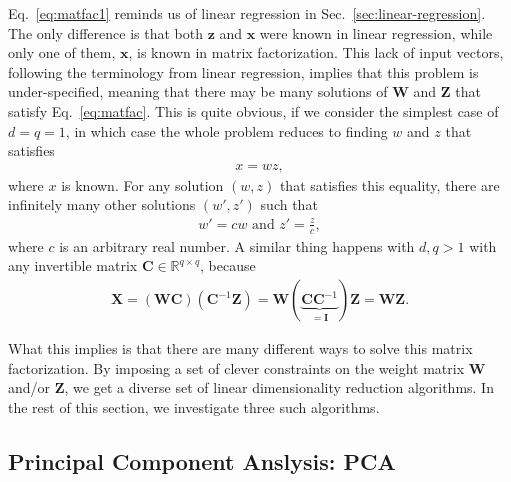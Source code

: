 \documentclass{report}
\newcommand{\vect}[1]{\mathbf{#1}}
\newcommand{\matr}[1]{\mathbf{#1}}
\newcommand{\vx}[0]{\vect{x}}
\newcommand{\vz}[0]{\vect{z}}
\newcommand{\mW}[0]{\matr{W}}
\newcommand{\mZ}[0]{\matr{Z}}
\newcommand{\mX}[0]{\matr{X}}
\newcommand{\mC}{\matr{C}}
\newcommand{\mI}{\matr{I}}
\newcommand{\RR}[0]{\mathbb{R}}
\begin{document}
Eq.~\eqref{eq:matfac1} reminds us of linear regression in
Sec.~\ref{sec:linear-regression}. The only difference is that both $\vz$ and
$\vx$ were known in linear regression, while only one of them, $\vx$, is known
in matrix factorization. This lack of input vectors, following the terminology
from linear regression, implies that this problem is under-specified, meaning
that there may be many solutions of $\mW$ and $\mZ$ that satisfy
Eq.~\eqref{eq:matfac}. This is quite obvious, if we consider the simplest case
of $d=q=1$, in which case the whole problem reduces to finding $w$ and $z$ that
satisfies
\begin{align*}
    x = w z,
\end{align*}
where $x$ is known. For any solution $(w, z)$ that satisfies this equality,
there are infinitely many other solutions $(w', z')$ such that
\begin{align*}
    w' = cw\text{ and }
    z' = \frac{z}{c},
\end{align*}
where $c$ is an arbitrary real number. A similar thing happens with $d, q > 1$
with any invertible matrix $\mC \in \RR^{q \times q}$, because
\begin{align*}
    \mX = (\mW \mC)(\mC^{-1} \mZ) = \mW (\underbrace{\mC \mC^{-1}}_{=\mI}) \mZ = \mW \mZ.
\end{align*}

What this implies is that there are many different ways to solve this matrix
factorization. By imposing a set of clever constraints on the weight matrix
$\mW$ and/or $\mZ$, we get a diverse set of linear dimensionality reduction
algorithms. In the rest of this section, we investigate three such algorithms. 


\subsection{Principal Component Anslysis: PCA}
\end{document}
